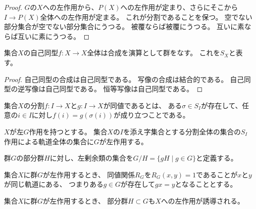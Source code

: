 \begin{proof}
    $G$の$X$への左作用から、$P(X)$への左作用が定まり、さらにそこから$I\to P(X)$全体への左作用が定まる。
    これが分割であることを保つ。
    空でない部分集合が空でない部分集合にうつる。
    被覆ならば被覆にうつる。
    互いに素ならば互いに素にうつる。
\end{proof}

\begin{proposition}
    \label{symmetric}
    集合$X$の自己同型$f:X\to X$全体は合成を演算として群をなす。
    これを$S_X$と表す。
\end{proposition}

\begin{proof}
    自己同型の合成は自己同型である。
    写像の合成は結合的である。
    自己同型の逆写像は自己同型である。
    恒等写像は自己同型である。
\end{proof}

\begin{proposition}
    \label{decomp-equiv}
    集合$X$の分割$f:I\to X$と$g:I\to X$が同値であるとは、
    ある$\sigma\in S_I$が存在して、任意の$i\in I$に対し$f(i)=g(\sigma(i))$が成り立つことである。
\end{proposition}

\begin{proposition}
    \label{decomp-equiv-action}
    $X$が左$G$作用を持つとする。
    集合$X$の$I$を添え字集合とする分割全体の集合の$S_I$作用による軌道全体の集合に$G$が左作用する。
\end{proposition}

\begin{definition}
    \label{quotient-def}
    群$G$の部分群$H$に対し、左剰余類の集合を$G/H=\{gH\mid g\in G\}$と定義する。
\end{definition}

\begin{proposition}\label{group-action-to-equivrel}
    集合$X$に群$G$が左作用するとき、
    同値関係$R_G$を$R_G(x,y)=1$であることが$x$と$y$が同じ軌道にある、
    つまりある$g\in G$が存在して$gx=y$となることとする。
\end{proposition}

\begin{proposition}\label{subgroup-action}
    集合$X$に群$G$が左作用するとき、
    部分群$H\subset G$も$X$への左作用が誘導される。
\end{proposition}


